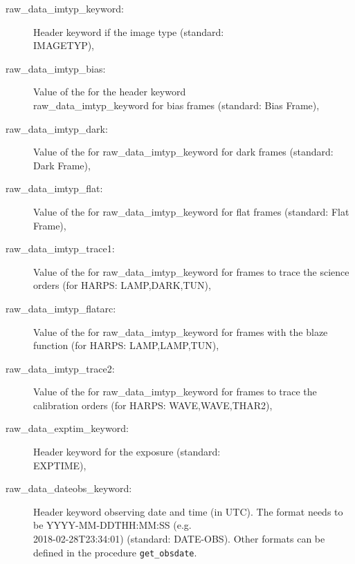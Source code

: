 \documentclass[10pt,a4paper]{article}
\begin{document}
\begin{description}
  \item[raw\_data\_imtyp\_keyword:] Header keyword if the image type (standard: \\ \mbox{IMAGETYP}),
  \item[raw\_data\_imtyp\_bias:] Value of the for the header keyword \\ raw\_data\_imtyp\_keyword for bias frames (standard: Bias Frame),
  \item[raw\_data\_imtyp\_dark:] Value of the for raw\_data\_imtyp\_keyword for dark frames (standard: Dark Frame),
  \item[raw\_data\_imtyp\_flat:] Value of the for raw\_data\_imtyp\_keyword for flat frames (standard: Flat Frame),
  \item[raw\_data\_imtyp\_trace1:] Value of the for raw\_data\_imtyp\_keyword for frames to trace the science orders (for HARPS: LAMP,DARK,TUN),
  \item[raw\_data\_imtyp\_flatarc:] Value of the for raw\_data\_imtyp\_keyword for frames with the blaze function (for HARPS: LAMP,LAMP,TUN),
  \item[raw\_data\_imtyp\_trace2:] Value of the for raw\_data\_imtyp\_keyword for frames to trace the calibration orders (for HARPS: WAVE,WAVE,THAR2),
  \item[raw\_data\_exptim\_keyword:] Header keyword for the exposure (standard: \\ \mbox{EXPTIME}),
  \item[raw\_data\_dateobs\_keyword:] Header keyword observing date and time (in UTC). The format needs to be \mbox{YYYY-MM-DDTHH:MM:SS} (e.g. \\ \mbox{2018-02-28T23:34:01})  (standard: \mbox{DATE-OBS}). Other formats can be defined in the procedure \verb|get_obsdate|.
\end{description}
\end{document}
